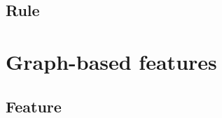 

\subsection{Rule}



\section{Graph-based features}\label{sec:theo-features}

\subsection{Feature}

